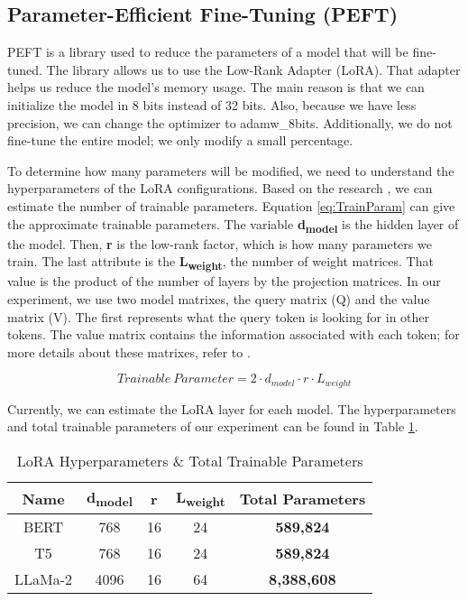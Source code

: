\subsection{Parameter-Efficient Fine-Tuning (PEFT)}
PEFT is a library used to reduce the parameters of a model that will be fine-tuned. The library allows us to use the Low-Rank Adapter (LoRA). That adapter helps us reduce the model's memory usage. The main reason is that we can initialize the model in 8 bits instead of 32 bits. Also, because we have less precision, we can change the optimizer to adamw\_8bits. Additionally, we do not fine-tune the entire model; we only modify a small percentage.

To determine how many parameters will be modified, we need to understand the hyperparameters of the LoRA configurations. Based on the research \cite{hu2021loralowrankadaptationlarge}, we can estimate the number of trainable parameters. Equation \ref{eq:TrainParam} can give the approximate trainable parameters. The variable \textbf{d\textsubscript{model}} is the hidden layer of the model. Then, \textbf{r} is the low-rank factor, which is how many parameters we train. The last attribute is the \textbf{L\textsubscript{weight}}, the number of weight matrices. That value is the product of the number of layers by the projection matrices. In our experiment, we use two model matrixes, the query matrix (Q) and the value matrix (V). The first represents what the query token is looking for in other tokens. The value matrix contains the information associated with each token; for more details about these matrixes, refer to \cite{vaswani2023attentionneed}.

\[ Trainable \ Parameter = 2 \cdot d_{model} \cdot r \cdot L_{weight} \label{eq:TrainParam} \tag{6} \] 

Currently, we can estimate the LoRA layer for each model. The hyperparameters and total trainable parameters of our experiment can be found in Table \ref{table:LoRA}.

\begin{table}[H]
	\centering
	\caption{LoRA Hyperparameters \& Total Trainable Parameters}
	\begin{tabular}{||c | c | c | c | c||} 
		\hline
		\textbf{Name} & \textbf{d\textsubscript{model}} & \textbf{r} & \textbf{L\textsubscript{weight}} & \textbf{Total Parameters} \\ [1ex] 
		\hline
		BERT & 768 & 16 & 24 & \textbf{589,824} \\ [1ex]
		\hline
		T5 & 768 & 16 & 24 & \textbf{589,824}  \\ [1ex]
		\hline
		LLaMa-2 & 4096 & 16 & 64 & \textbf{8,388,608}  \\ [1ex]
		\hline
	\end{tabular}
	\label{table:LoRA}
\end{table}

